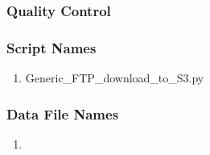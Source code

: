 \subsubsection*{Quality Control}

\subsubsection*{Script Names}

\begin{enumerate}
\item Generic\_FTP\_download\_to\_S3.py
\end{enumerate}

\subsubsection*{Data File Names}

\begin{enumerate}
\item 
\end{enumerate}
